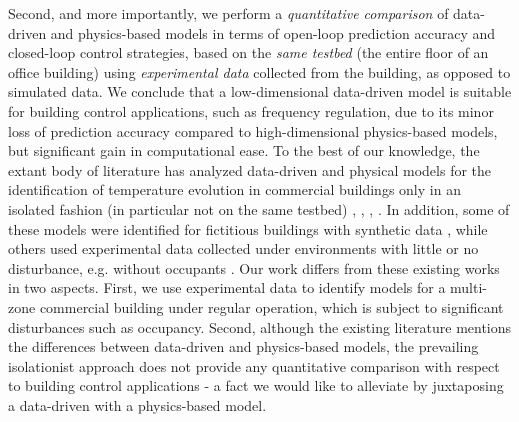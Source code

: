 Second, and more importantly, we perform a \textit{quantitative comparison} of data-driven and physics-based models in terms of open-loop prediction accuracy and closed-loop control strategies, based on the \textit{same testbed} (the entire floor of an office building) using \textit{experimental data} collected from the building, as opposed to simulated data. %
We conclude that a low-dimensional data-driven model is suitable for building control applications, such as frequency regulation, due to its minor loss of prediction accuracy compared to high-dimensional physics-based models, but significant gain in computational ease. 
To the best of our knowledge, the extant body of literature has analyzed data-driven and physical models for the identification of temperature evolution in commercial buildings only in an isolated fashion (in particular not on the same testbed) \cite{Ma:2011aa}, \cite{Siroky:2011aa}, \cite{Lin:2015aa}, \cite{Qie}. In addition, some of these models were identified for fictitious buildings with synthetic data \cite{Cole:2013aa, Goyal:2013aa, David}, while others used experimental data collected under environments with little or no disturbance, e.g. without occupants \cite{Lin:2015aa}. Our work differs from these existing works in two aspects. First, we use experimental data to identify models for a multi-zone commercial building under regular operation, which is subject to significant disturbances such as occupancy. Second, although the existing literature mentions the differences between data-driven and physics-based models, the prevailing isolationist approach does not provide any quantitative comparison with respect to building control applications - a fact we would like to alleviate by juxtaposing a data-driven with a physics-based model.



